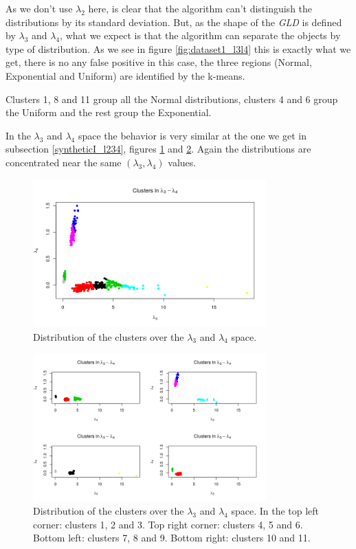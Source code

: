  
As we don't use $\lambda_{2}$ here, is clear that the algorithm can't distinguish the distributions by its standard deviation. But, as the shape of the \textit{GLD} is defined by $\lambda_{3}$ and $\lambda_{4}$, what we expect is that the algorithm can separate the objects by type of distribution. As we see in figure \ref{fig:dataset1_l3l4} this is exactly what we get, there is no any false positive in this case, the three regions (Normal, Exponential and Uniform) are identified by the k-means.

Clusters 1, 8 and 11 group all the Normal distributions, clusters 4 and 6 group the Uniform and the rest group the Exponential.

In the $\lambda_{3}$ and $\lambda_{4}$ space the behavior is very similar at the one we get in subsection \ref{syntheticI_l234}, figures \ref{fig:dataset1_l3l4_l3_l4} and \ref{fig:dataset1_l3l4_l3_l4_dividido}. Again the distributions are concentrated near the same $(\lambda_{3}, \lambda_{4})$ values.

\begin{figure}[H]
    \centering
    \includegraphics[width=0.8\textwidth]{img/gld_clustering/Dataset1/l3_l4/l3_l4.png}
    \caption{Distribution of the clusters over the $\lambda_{3}$ and $\lambda_{4}$ space.}
    \label{fig:dataset1_l3l4_l3_l4}
\end{figure}

\begin{figure}[H]
    \centering
    \includegraphics[width=0.8\textwidth]{img/gld_clustering/Dataset1/l3_l4/l3_l4_dividido.png}
    \caption{Distribution of the clusters over the $\lambda_{3}$ and $\lambda_{4}$ space. In the top left corner: clusters 1, 2 and 3. Top right corner: clusters 4, 5 and 6. Bottom left: clusters 7, 8 and 9. Bottom right: clusters 10 and 11.}
    \label{fig:dataset1_l3l4_l3_l4_dividido}
\end{figure}

